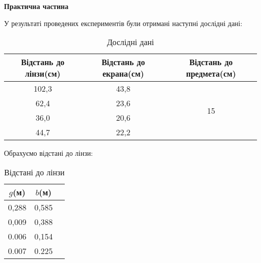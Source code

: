 \begin{center}
    \Large{\textbf{Практична частина}}
\end{center}

\vspace{1mm}

У результаті проведених експериментів 
були отримані наступні дослідні дані:
\begin{table}[h] \label{table:raw}
    \centering
    \begin{tabular}{ |c|c|c| }
        \hline 
        \textbf{Відстань до лінзи(см)} & \textbf{Відстань до екрана(см)} & \textbf{Відстань до предмета(см)} \\
        \hline
        102,3 & 43,8 & \multirow{4}{*}{15} \\
        \cline{1-2}
        62,4 & 23,6 & \\
        \cline{1-2}
        36,0 & 20,6 & \\
        \cline{1-2}
        44,7 & 22,2 & \\
        \hline
    \end{tabular}
    \caption{Дослідні дані}
\end{table}


Обрахуємо відстані до лінзи:
\begin{table}[h] \label{tabel:gb}
    \centering
    \begin{tabular}{ |c|c|c| }
        \hline 
        \textbf{$g$(м)} & \textbf{$b$(м)}  \\
        \hline
        0,288 & 0,585 \\
        \hline
        0,009 & 0,388 \\
        \hline
        0.006 & 0,154 \\
        \hline
        0.007 & 0.225 \\
        \hline
    \end{tabular}
    \caption{Відстані до лінзи}
\end{table}

